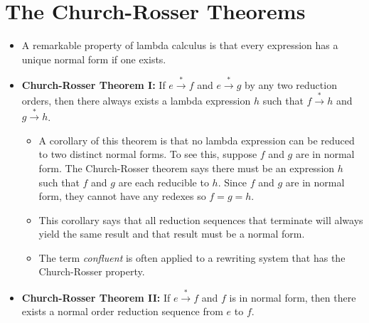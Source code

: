 \documentclass[]{article}
\begin{document}
\section{The Church-Rosser Theorems}
\begin{itemize}
\item A remarkable property of lambda calculus is that every expression has a
unique normal form if one exists.
\item \textbf{Church-Rosser Theorem I:} If $e\overset{*}{\rightarrow}f$ and
$e\overset{*}{\rightarrow}g$ by any two reduction orders, then there always
exists a lambda expression $h$ such that $f\overset{*}{\rightarrow}h$ and
$g\overset{*}{\rightarrow}h$.
\begin{itemize}
\item A corollary of this theorem is that no lambda expression can be reduced to
two distinct normal forms. To see this, suppose $f$ and $g$ are in normal form.
The Church-Rosser theorem says there must be an expression $h$ such that $f$ and
$g$ are each reducible to $h$. Since $f$ and $g$ are in normal form, they cannot
have any redexes so $f = g = h$.
\item This corollary says that all reduction sequences that terminate will
always yield the same result and that result must be a normal form.
\item The term \emph{confluent} is often applied to a rewriting system that has
the Church-Rosser property.
\end{itemize}
\item \textbf{Church-Rosser Theorem II:} If $e\overset{*}{\rightarrow}f$ and $f$
is in normal form, then there exists a normal order reduction sequence from $e$
to $f$.
\end{itemize}
\end{document}
